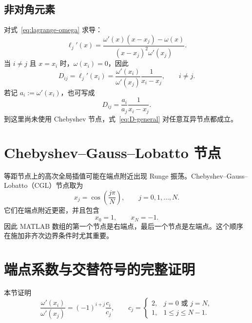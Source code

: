 \documentclass[11pt,a4paper]{ctexart}
\numberwithin{equation}{section}
\begin{document}
\subsection{非对角元素}

对式~\eqref{eq:lagrange-omega} 求导：
\begin{equation}
  \ell_j'(x)=
  \frac{\omega'(x)(x-x_j)-\omega(x)}
  {(x-x_j)^2\omega'(x_j)}.
\end{equation}
当 $i\ne j$ 且 $x=x_i$ 时，$\omega(x_i)=0$，因此
\begin{equation}
  \boxed{
  D_{ij}=\ell_j'(x_i)
  =\frac{\omega'(x_i)}{\omega'(x_j)}
  \frac{1}{x_i-x_j}},
  \qquad i\ne j.
  \label{eq:D-general}
\end{equation}
若记 $a_i:=\omega'(x_i)$，也可写成
\begin{equation}
  D_{ij}=\frac{a_i}{a_j}\frac{1}{x_i-x_j}.
\end{equation}
到这里尚未使用 Chebyshev 节点，式~\eqref{eq:D-general} 对任意互异节点都成立。

\section{Chebyshev--Gauss--Lobatto 节点}

等距节点上的高次全局插值可能在端点附近出现 Runge 振荡。Chebyshev--Gauss--Lobatto（CGL）节点取为
\begin{equation}
  \boxed{x_j=\cos\left(\frac{j\pi}{N}\right)},
  \qquad j=0,1,\ldots,N.
  \label{eq:cgl}
\end{equation}
它们在端点附近更密，并且包含
\begin{equation}
  x_0=1,\qquad x_N=-1.
\end{equation}
因此 MATLAB 数组的第一个节点是右端点，最后一个节点是左端点。这个顺序在施加非齐次边界条件时尤其重要。

\section{端点系数与交替符号的完整证明}

本节证明
\begin{equation}
  \boxed{
  \frac{\omega'(x_i)}{\omega'(x_j)}
  =(-1)^{i+j}\frac{c_i}{c_j}},
  \qquad
  c_j=\begin{cases}2,&j=0\text{ 或 }j=N,\\1,&1\le j\le N-1.\end{cases}
  \label{eq:omega-ratio}
\end{equation}
\end{document}
